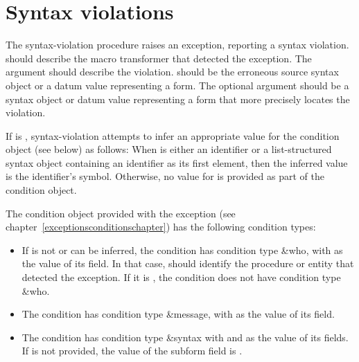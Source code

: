 \section{Syntax violations}

\begin{entry}{%
}

The {\cf syntax-violation} procedure raises an exception, reporting 
a syntax violation.  
 should describe the macro transformer that
detected the exception.  The  argument should describe
the violation.
 should be the erroneous source syntax
object or a datum value representing a form. The optional
 argument should be a syntax
object or datum value representing a form that more precisely locates the
violation.

If  is \schfalse{}, {\cf syntax-violation} attempts to
infer an appropriate value for the condition object (see below) as
follows:  When  is either an identifier or a
list-structured syntax object containing an identifier as its first element, then
the inferred value is the identifier's symbol.
Otherwise, no value for  is provided as part of the
condition object.

The condition object provided with the exception (see
chapter~\ref{exceptionsconditionschapter}) has the following condition types:
%
\begin{itemize}
\item If  is not \schfalse{} or can be inferred, the condition has condition type
  {\cf \&who}, with  as the value of its field.  In
  that case,  should identify the procedure or entity that
  detected the exception.  If it is \schfalse, the condition does not
  have condition type {\cf \&who}.
\item The condition has condition type {\cf \&message}, with
   as the value of its field.
\item The condition has condition type {\cf \&syntax} 
  with  and  as the value of its fields.
  If  is not provided, the value of the subform
  field is \schfalse.
\end{itemize}
\end{entry}

